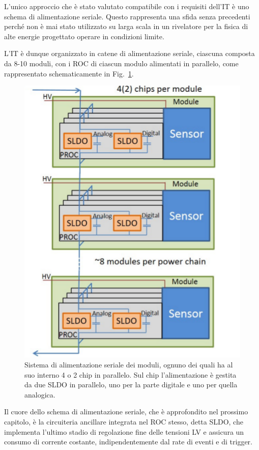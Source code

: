 L'unico approccio che \`e stato valutato compatibile con i requisiti dell'IT \`e uno schema di alimentazione seriale. Questo rappresenta una sfida senza precedenti perch\'e non \`e mai stato utilizzato su larga scala in un rivelatore per la fisica di alte energie progettato operare in condizioni limite.

L'IT \`e dunque organizzato in catene di alimentazione seriale, ciascuna composta da 8-10 moduli, con i ROC di ciascun modulo alimentati in parallelo, come rappresentato schematicamente in Fig.~\ref{serial}. 
\begin{figure}
\centering
\includegraphics[scale=0.4]{Immagini/serial}
\caption{Sistema di alimentazione seriale dei moduli, ognuno dei quali ha al suo interno 4 o 2 chip in parallelo. Sul chip l'alimentazione è gestita da due SLDO in parallelo, uno per la parte digitale e uno per quella analogica.}
\label{serial}
\end{figure}
Il cuore dello schema di alimentazione seriale, che \`e approfondito nel prossimo capitolo, \`e la circuiteria ancillare integrata nel ROC stesso, detta SLDO, che implementa l'ultimo stadio di regolazione fine delle tensioni LV e assicura un consumo di corrente costante, indipendentemente dal rate di eventi e di trigger.

